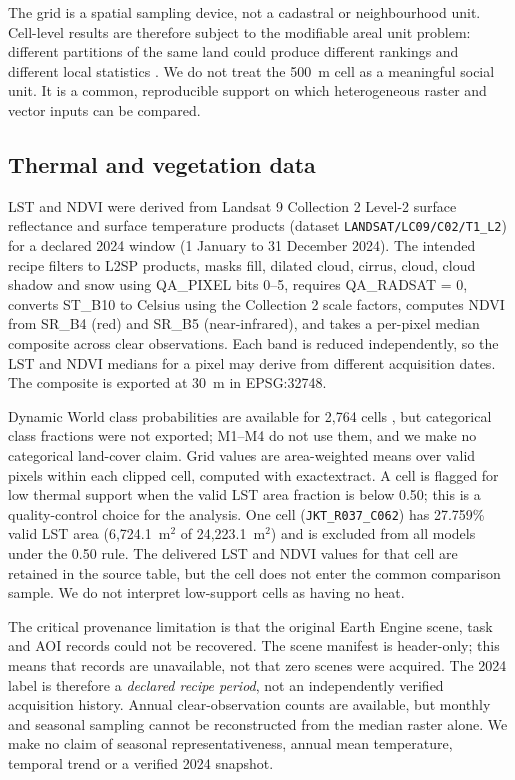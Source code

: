 \documentclass[times,twoside]{_Templates/MultiTargetManuscript}
\begin{document}
The grid is a spatial sampling device, not a cadastral or neighbourhood unit.
Cell-level results are therefore subject to the modifiable areal unit problem:
different partitions of the same land could produce different rankings and
different local statistics \citep{openshaw1984}. We do not treat the 500~m cell
as a meaningful social unit. It is a common, reproducible support on which
heterogeneous raster and vector inputs can be compared.

\subsection{Thermal and vegetation data}

LST and NDVI were derived from Landsat 9 Collection 2 Level-2 surface
reflectance and surface temperature products (dataset
\texttt{LANDSAT/LC09/C02/T1\_L2}) \citep{usgs2020} for a declared 2024 window
(1 January to 31 December 2024). The intended recipe filters to L2SP products, masks fill,
dilated cloud, cirrus, cloud, cloud shadow and snow using QA\_PIXEL bits 0--5,
requires QA\_RADSAT = 0, converts ST\_B10 to Celsius using the Collection 2
scale factors, computes NDVI from SR\_B4 (red) and SR\_B5 (near-infrared), and
takes a per-pixel median composite across clear observations. Each band is
reduced independently, so the LST and NDVI medians for a pixel may derive from
different acquisition dates. The composite is exported at 30~m in EPSG:32748.

Dynamic World class probabilities are available for 2,764 cells
\citep{brown2022}, but categorical class fractions were not exported; M1--M4 do
not use them, and we make no categorical land-cover claim.
Grid values are area-weighted means over valid pixels within each clipped cell,
computed with exactextract. A cell is flagged for low thermal support when the
valid LST area fraction is below 0.50; this is a quality-control choice for the
analysis. One cell
(\texttt{JKT\_R037\_C062}) has 27.759\% valid LST area (6,724.1~m$^2$ of
24,223.1~m$^2$) and is excluded from all models under the 0.50 rule. The
delivered LST and NDVI values for that cell are retained in the source table, but
the cell does not enter the common comparison sample. We do not interpret
low-support cells as having no heat.

The critical provenance limitation is that the original Earth Engine scene,
task and AOI records could not be recovered. The scene manifest is header-only;
this means that records are unavailable, not that zero scenes were acquired.
The 2024 label is therefore a \emph{declared recipe period}, not an
independently verified acquisition history. Annual clear-observation counts are
available, but monthly and seasonal sampling cannot be reconstructed from the
median raster alone. We make no claim of seasonal representativeness, annual mean
temperature, temporal trend or a verified 2024 snapshot.
\end{document}
